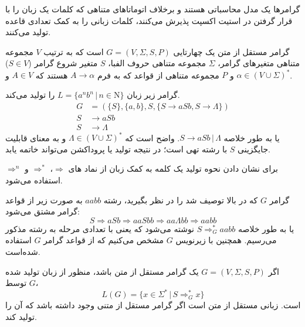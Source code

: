 \documentclass[main.tex]{subfiles}
\begin{document}
	گرامر‌ها یک مدل محاسباتی هستند و برخلاف اتوماتا‌های متناهی که کلمات یک زبان را با قرار گرفتن در استیت اکسپت پذیرش می‌کنند، کلمات زبانی را به کمک تعدادی قاعده
	تولید می‌کنند.
	\begin{definition}
		گرامر مستقل از متن یک چهار‌تایی 
		$G = (V, \Sigma, S, P)$
		است که به ترتیب $V$ مجموعه متناهی متغیر‌های گرامر، 
		$\Sigma$
		مجموعه متناهی حروف الفبا، $S$ متغیر شروع گرامر ($S \in V$) و $P$ مجموعه متناهی از قواعد که به فرم 
		$A \rightarrow \alpha$
		هستند که 
		$A \in V$ 
		و
		$\alpha \in (V \cup \Sigma)^*$.
	\end{definition}
	
	\begin{example}
		گرامر زیر زبان 
		$L = \{a^nb^n \, | \, n \in \mathrm{N}\}$
		را تولید می‌کند.
		\begin{align*}
			G &= (\{S\}, \{a, b\}, S, \{S \rightarrow aSb, S \rightarrow \Lambda\}) \\
			S &\rightarrow aSb \\
			S &\rightarrow \Lambda
		\end{align*}
	یا به طور خلاصه
	$S \rightarrow aSb \, | \, \Lambda$.
	واضح است که 
	$\Lambda \in (V \cup \Sigma)^*$
	و به معنای قابلیت جایگزینی $S$ با رشته تهی است؛ در نتیجه تولید یا پروداکشن می‌تواند خاتمه یابد.
	\end{example}
	
	برای نشان دادن نحوه تولید یک کلمه به کمک زبان از نماد های 
	$\Rightarrow$،
	$\Rightarrow^*$
	و
	$\Rightarrow^n$
	استفاده می‌شود.
	
	\begin{example}
		گرامر $G$ که در بالا توصیف شد را در نظر بگیرید، رشته 
		$aabb$
		به صورت زیر از قواعد گرامر مشتق
		 می‌شود:
		 $$S \Rightarrow aSb \Rightarrow aaSbb \Rightarrow aa\Lambda bb \Rightarrow aabb$$
		یا به طور خلاصه 
		$S \Rightarrow^{*}_G aabb$
		نوشته می‌شود که یعنی با تعدادی مرحله به رشته مذکور می‌رسیم. همچنین با زیرنویس $G$ مشخص می‌کنیم که از قواعد گرامر $G$ استفاده شده‌است.
	\end{example}
	
	\begin{definition}
	اگر 
	$G = (V, \Sigma, S, P)$
	یک 
	گرامر مستقل از متن باشد، منظور از زبان تولید شده توسط $G$، 
	$$L(G) = \{x \in \Sigma^* \, | \, S \Rightarrow^{*}_G x \}$$
	است. زبانی مستقل از متن است اگر گرامر مستقل از متنی وجود داشته باشد که آن را تولید کند.
	\end{definition}
	
\end{document}
